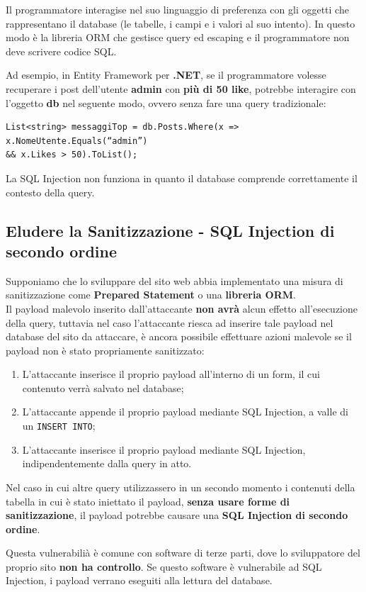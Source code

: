 \documentclass{article}
\begin{document}
Il programmatore interagise nel suo linguaggio di preferenza con gli oggetti che rappresentano il database (le tabelle, i campi e i valori al suo intento). In questo modo è la libreria ORM che gestisce query ed escaping e il programmatore non deve scrivere codice SQL.

Ad esempio, in Entity Framework per \textbf{.NET}, se il programmatore volesse recuperare i post dell’utente \textbf{admin} con \textbf{più di 50 like}, potrebbe interagire con l’oggetto \textbf{db} nel seguente modo, ovvero senza fare una query tradizionale:
\begin{verbatim}
List<string> messaggiTop = db.Posts.Where(x => x.NomeUtente.Equals(“admin”) 
&& x.Likes > 50).ToList();
\end{verbatim}

La SQL Injection non funziona in quanto il database comprende correttamente il contesto della query.

\subsection{Eludere la Sanitizzazione - SQL Injection di secondo ordine}
Supponiamo che lo sviluppare del sito web abbia implementato una misura di sanitizzazione come \textbf{Prepared Statement} o una \textbf{libreria ORM}.\\
Il payload malevolo inserito dall'attaccante \textbf{non avrà} alcun effetto all'esecuzione della query, tuttavia nel caso l'attaccante riesca ad inserire tale payload nel database del sito da attaccare, è ancora possibile effettuare azioni malevole se il payload non è stato propriamente sanitizzato:
\begin{enumerate}
	\item L’attaccante inserisce il proprio payload all’interno di un form, il cui contenuto verrà salvato nel database;
	\item L’attaccante appende il proprio payload mediante SQL Injection, a valle di un \verb|INSERT INTO|;
	\item L’attaccante inserisce il proprio payload mediante SQL Injection, indipendentemente dalla query in atto.	
\end{enumerate}

Nel caso in cui altre query	utilizzassero in un secondo momento i contenuti della tabella in cui è stato iniettato il payload, \textbf{senza usare forme di sanitizzazione}, il payload potrebbe causare una \textbf{SQL Injection di secondo ordine}.

Questa vulnerabilià è comune con software di terze parti, dove lo sviluppatore del proprio sito \textbf{non ha controllo}. Se questo software è vulnerabile ad SQL Injection, i payload verrano eseguiti alla lettura del database.
\end{document}

